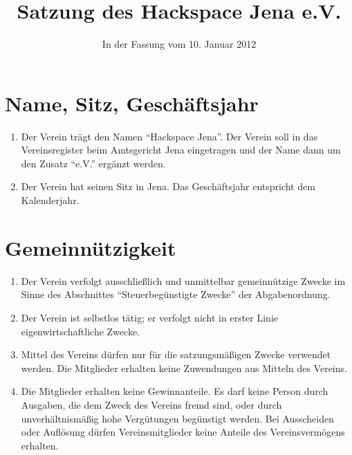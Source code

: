 \documentclass[fontsize=12pt,paper=a4,pagesize]{scrartcl}
\title{Satzung des Hackspace Jena e.V.}
\date{In der Fassung vom 10. Januar 2012}
\begin{document}
\maketitle
\section{Name, Sitz, Geschäftsjahr}

\begin{enumerate}
	\item Der Verein trägt den Namen ``Hackspace Jena''. Der Verein soll in
		das Vereinsregister beim Amtsgericht Jena eingetragen und der Name
		dann um den Zusatz ``e.V.'' ergänzt werden.
	\item Der Verein hat seinen Sitz in Jena. Das Geschäftsjahr entspricht
		dem Kalenderjahr.
\end{enumerate}

\section{Gemeinnützigkeit}

\begin{enumerate}
	\item Der Verein verfolgt ausschließlich und unmittelbar gemeinnützige
		Zwecke im Sinne des Abschnittes ``Steuerbegünstigte Zwecke'' der
		Abgabenordnung.
	\item Der Verein ist selbstlos tätig; er verfolgt nicht in erster Linie
		eigenwirtschaftliche Zwecke.
	\item Mittel des Vereins dürfen nur für die satzungsmäßigen Zwecke
		verwendet werden. Die Mitglieder erhalten keine Zuwendungen aus
		Mitteln des Vereins.
	\item Die Mitglieder erhalten keine Gewinnanteile. Es darf keine Person
		durch Ausgaben, die dem Zweck des Vereins fremd sind, oder durch
		unverhältnismäßig hohe Vergütungen begünstigt werden. Bei
		Ausscheiden oder Auflösung dürfen Vereinsmitglieder keine Anteile
		des Vereinsvermögens erhalten.
\end{enumerate}
\end{document}
